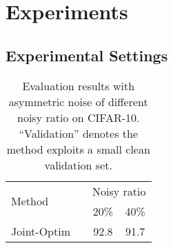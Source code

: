 \documentclass[10pt,twocolumn,letterpaper]{article}
\newcommand{\red}[1]{{#1}}
\begin{document}
\section{Experiments} \label{sec:expriment}
\subsection{Experimental Settings}






\begin{table}
\footnotesize
    \caption{Evaluation results with asymmetric noise of different noisy ratio on CIFAR-10. \red{``Validation'' denotes the method exploits a small clean validation set.}}
    \vspace{-1em}
    \centering
    \begin{tabular}{p{3.2cm} |c |cc}
        \toprule
        \multirow{2}{*}{Method}  & & \multicolumn{2}{c}{Noisy ratio} \\ \cmidrule{3-4} 
        & \cellcolor{white}\multirow{-2}{*}{\red{Validation}} & 20\% & 40\% \\ \midrule
        Joint-Optim\cite{tanaka2018joint}       &   \red{{\XSolidBrush}}    & 92.8    & 91.7 \\ 
        

\end{tabular}
\end{table}
\end{document}
